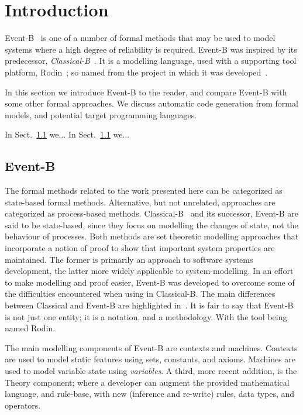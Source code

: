 \section{Introduction}
Event-B~\cite{ABR10} is one of a number of formal methods that may be used to model systems where a high degree of reliability is required. Event-B was inspired by its predecessor, \emph{Classical-B}~\cite{TheBBook}. It is a modelling language, used with a supporting tool platform, Rodin~\cite{abrial10rodin}; so named from the project in which it was developed~\cite{RodinTool}.  

In this section we introduce Event-B to the reader, and compare Event-B with some other formal approaches. We discuss automatic code generation from formal models, and potential target programming languages.

In Sect.~\ref{} we...
In Sect.~\ref{} we...

\subsection{Event-B}
The formal methods related to the work presented here can be categorized as state-based formal methods. Alternative, but not unrelated, approaches are categorized as process-based methods. Classical-B~\cite{TheBBook,CNP,CNPInterface,B4Free} and its successor, Event-B are said to be state-based, since they focus on modelling the changes of state, not the behaviour of processes. Both methods are set theoretic modelling approaches that incorporate a notion of proof to show that important system properties are maintained. The former is primarily an approach to software systems development, the latter more widely applicable to system-modelling. In an effort to make modelling and proof easier, Event-B was developed to overcome some of the difficulties encountered when using in Classical-B. The main differences between Classical and Event-B are highlighted in~\cite{Hallerstede07}. It is fair to say that Event-B is not just one entity;  it is a notation, and a methodology. With the tool being named Rodin. 

The main modelling components of Event-B are contexts and machines. Contexts are used to model static features using sets, constants, and axioms. Machines are used to model variable state using \emph{variables}. A third, more recent addition, is the Theory component; where a developer can augment the provided mathematical language, and rule-base, with new (inference and re-write) rules, data types, and operators. 

